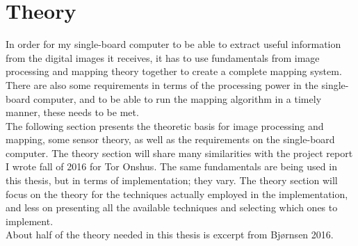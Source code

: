 \section{Theory}
In order for my single-board computer to be able to extract useful information from the digital images it receives, it has to use fundamentals from image processing and mapping theory together to create a complete mapping system. There are also some requirements in terms of the processing power in the single-board computer, and to be able to run the mapping algorithm in a timely manner, these needs to be met. \\

The following section presents the theoretic basis for image processing and mapping, some sensor theory, as well as the requirements on the single-board computer. The theory section will share many similarities with the project report\cite{kris} I wrote fall of 2016 for Tor Onshus. The same fundamentals are being used in this thesis, but in terms of implementation; they vary. The theory section will focus on the theory for the techniques actually employed in the implementation, and less on presenting all the available techniques and selecting which ones to implement.\\

About half of the theory needed in this thesis is excerpt from Bjørnsen 2016\cite{kris}.



\newpage

\newpage



